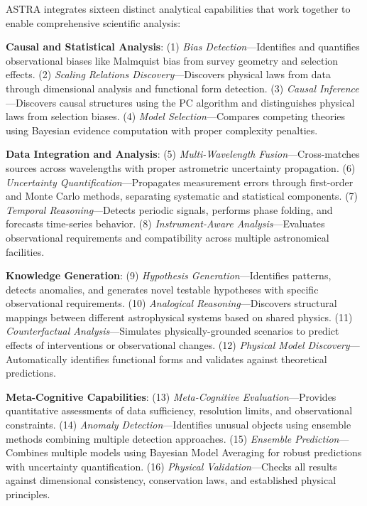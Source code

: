 \documentclass[usenatbib]{rasti}
\begin{document}
ASTRA integrates sixteen distinct analytical capabilities that work together to enable comprehensive scientific analysis:

\textbf{Causal and Statistical Analysis}: (1) \textit{Bias Detection}---Identifies and quantifies observational biases like Malmquist bias from survey geometry and selection effects. (2) \textit{Scaling Relations Discovery}---Discovers physical laws from data through dimensional analysis and functional form detection. (3) \textit{Causal Inference}---Discovers causal structures using the PC algorithm and distinguishes physical laws from selection biases. (4) \textit{Model Selection}---Compares competing theories using Bayesian evidence computation with proper complexity penalties.

\textbf{Data Integration and Analysis}: (5) \textit{Multi-Wavelength Fusion}---Cross-matches sources across wavelengths with proper astrometric uncertainty propagation. (6) \textit{Uncertainty Quantification}---Propagates measurement errors through first-order and Monte Carlo methods, separating systematic and statistical components. (7) \textit{Temporal Reasoning}---Detects periodic signals, performs phase folding, and forecasts time-series behavior. (8) \textit{Instrument-Aware Analysis}---Evaluates observational requirements and compatibility across multiple astronomical facilities.

\textbf{Knowledge Generation}: (9) \textit{Hypothesis Generation}---Identifies patterns, detects anomalies, and generates novel testable hypotheses with specific observational requirements. (10) \textit{Analogical Reasoning}---Discovers structural mappings between different astrophysical systems based on shared physics. (11) \textit{Counterfactual Analysis}---Simulates physically-grounded scenarios to predict effects of interventions or observational changes. (12) \textit{Physical Model Discovery}---Automatically identifies functional forms and validates against theoretical predictions.

\textbf{Meta-Cognitive Capabilities}: (13) \textit{Meta-Cognitive Evaluation}---Provides quantitative assessments of data sufficiency, resolution limits, and observational constraints. (14) \textit{Anomaly Detection}---Identifies unusual objects using ensemble methods combining multiple detection approaches. (15) \textit{Ensemble Prediction}---Combines multiple models using Bayesian Model Averaging for robust predictions with uncertainty quantification. (16) \textit{Physical Validation}---Checks all results against dimensional consistency, conservation laws, and established physical principles.
\end{document}
